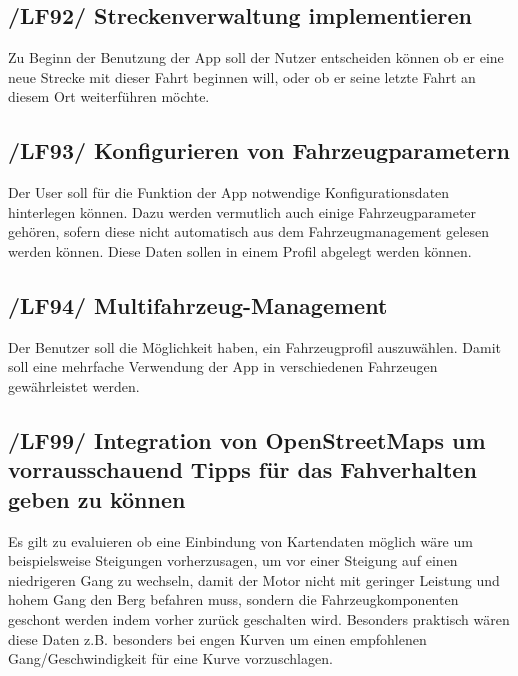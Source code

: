 \subsection{/LF92/ Streckenverwaltung implementieren}
\newline
Zu Beginn der Benutzung der App soll der Nutzer entscheiden können ob er eine neue Strecke mit dieser Fahrt beginnen will, oder ob er seine letzte Fahrt an diesem Ort weiterführen möchte.

\subsection{/LF93/ Konfigurieren von Fahrzeugparametern}
\newline
Der User soll für die Funktion der App notwendige Konfigurationsdaten hinterlegen können. Dazu werden vermutlich auch einige Fahrzeugparameter gehören, sofern diese nicht automatisch aus dem Fahrzeugmanagement gelesen werden können. Diese Daten sollen in einem Profil abgelegt werden können.

\subsection{/LF94/ Multifahrzeug-Management}
\newline
Der Benutzer soll die Möglichkeit haben, ein Fahrzeugprofil auszuwählen. Damit soll eine mehrfache Verwendung der App in verschiedenen Fahrzeugen gewährleistet werden.

\subsection{/LF99/ Integration von OpenStreetMaps um vorrausschauend Tipps für das Fahverhalten geben zu können}
\newline
Es gilt zu evaluieren ob eine Einbindung von Kartendaten möglich wäre um beispielsweise Steigungen vorherzusagen, um vor einer Steigung auf einen niedrigeren Gang zu wechseln, damit der Motor nicht mit geringer Leistung und hohem Gang den Berg befahren muss, sondern die Fahrzeugkomponenten geschont werden indem vorher zurück geschalten wird. Besonders praktisch wären diese Daten z.B. besonders bei engen Kurven um einen empfohlenen Gang/Geschwindigkeit für eine Kurve vorzuschlagen.  